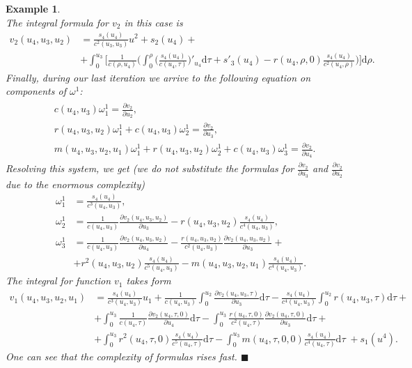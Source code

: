 \documentclass[12pt]{article}
\newtheorem{Ex}{Example}[section]
\theoremstyle{remark}
\newcommand{\ddd}{\mathrm{d}}
\newcommand{\pd}[2]{\frac{\partial#1}{\partial#2}}
\begin{document}
\begin{Ex}
{$$$$
The integral formula for $v_2$ in this case is
$$
\begin{aligned}
v_2(u_4, u_3, u_2) & = \frac{s_4(u_4)}{c^2(u_3, u_3)}u^2 + s_2(u_4) + \\
& + \int^{u_3}_0 \Bigg[ \frac{1}{c(\rho, u_4)} \Bigg( \int_0^{\rho}\Big( \frac{s_4(u_4)}{c(u_4, \tau)}\Big)'_{u_4} \ddd \tau + s'_3(u_4) - r(u_4, \rho, 0) \frac{s_4(u_4)}{c^2(u_4, \rho)}\Bigg)\Bigg] \ddd \rho .   
\end{aligned}
$$
Finally, during our last iteration we arrive to the following equation on components of $\omega^1$:
$$
\begin{aligned}
\begin{aligned}
& c(u_4, u_3) \omega^1_1 = \pd{v_2}{u_2}, \\
& r(u_4, u_3, u_2) \omega^1_1 + c(u_4, u_3) \omega^1_2 = \pd{v_2}{u_3}, \\
& m(u_4, u_3, u_2, u_1) \omega^1_1 + r(u_4, u_3, u_2) \omega^1_2 + c(u_4, u_3) \omega^1_3 = \pd{v_2}{u_4}.
\end{aligned}
\end{aligned}
$$
Resolving this system, we get (we do not substitute the formulas for $\pd{v_2}{u_3}$ and $\pd{v_2}{u_2}$ due to the enormous complexity)
$$
\begin{aligned}
\omega^1_1 & = \frac{s_4(u_4)}{c^3(u_4, u_3)}, \\
\omega^1_2 & = \frac{1}{c(u_4, u_3)} \pd{v_2 (u_4, u_3, u_2)}{u_3} - r(u_4, u_3, u_2)\frac{s_4(u_4)}{c^4(u_4, u_3)}, \\
\omega^1_3 & = \frac{1}{c(u_4, u_3)} \pd{v_2 (u_4, u_3, u_2)}{u_4} - \frac{r(u_4, u_3, u_2)}{c^2(u_4, u_3)} \pd{v_2 (u_4, u_3, u_2)}{u_3} + \\
& + r^2(u_4, u_3, u_2)\frac{s_4(u_4)}{c^5(u_4, u_3)} - m(u_4, u_3, u_2, u_1) \frac{s_4(u_4)}{c^4(u_4, u_3)}.
\end{aligned}
$$
The integral for function $v_1$ takes form
$$
\begin{aligned}
v_1(u_4, u_3, u_2, u_1) & = \frac{s_4(u_4)}{c^3(u_4, u_3)} u_1 + \frac{1}{c(u_4, u_3)} \int^{u_2}_0 \pd{v_2(u_4, u_3, \tau)}{u_3} \ddd \tau - \frac{s_4(u_4)}{c^4(u_4, u_3)} \int_0^{u_2} r(u_4, u_3, \tau) \ddd \tau + \\
& + \int_0^{u_3} \frac{1}{c(u_4, \tau)} \pd{v_2 (u_4, \tau, 0)}{u_4} \ddd \tau - \int_0^{u_3} \frac{r(u_4, \tau, 0)}{c^2(u_4, \tau)} \pd{v_2 (u_4, \tau, 0)}{u_3} \ddd \tau + \\
& + \int_0^{u_3} r^2(u_4, \tau, 0)\frac{s_4(u_4)}{c^5(u_4, \tau)} \ddd \tau - \int_0^{u_3} m(u_4, \tau, 0, 0) \frac{s_4(u_4)}{c^4(u_4, \tau)} \ddd \tau \;+ s_1(u^4) .
\end{aligned}
$$
One can see that the complexity of formulas rises fast. $\blacksquare$
}    
\end{Ex}
\end{document}
